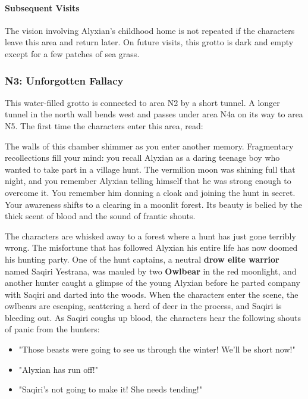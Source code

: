 \documentclass[10pt,a4,twoside,twocolumn,openany,nodeprecatedcode]{dndbook}
\begin{document}
\paragraph{Subsequent Visits}
The vision involving Alyxian's childhood home is not repeated if the characters leave this area and return later. On future visits, this grotto is dark and empty except for a few patches of sea grass.
\subsubsection{N3: Unforgotten Fallacy}
This water-filled grotto is connected to area N2 by a short tunnel. A longer tunnel in the north wall bends west and passes under area N4a on its way to area N5.
The first time the characters enter this area, read:
\begin{DndReadAloud}{}
The walls of this chamber shimmer as you enter another memory. Fragmentary recollections fill your mind: you recall Alyxian as a daring teenage boy who wanted to take part in a village hunt. The vermilion moon was shining full that night, and you remember Alyxian telling himself that he was strong enough to overcome it. You remember him donning a cloak and joining the hunt in secret.
Your awareness shifts to a clearing in a moonlit forest. Its beauty is belied by the thick scent of blood and the sound of frantic shouts.
\end{DndReadAloud}

The characters are whisked away to a forest where a hunt has just gone terribly wrong. The misfortune that has followed Alyxian his entire life has now doomed his hunting party. One of the hunt captains, a neutral \textbf{drow elite warrior} named Saqiri Yestrana, was mauled by two \textbf{Owlbear} in the red moonlight, and another hunter caught a glimpse of the young Alyxian before he parted company with Saqiri and darted into the woods.
When the characters enter the scene, the owlbears are escaping, scattering a herd of deer in the process, and Saqiri is bleeding out. As Saqiri coughs up blood, the characters hear the following shouts of panic from the hunters:
\begin{itemize}

\item "Those beasts were going to see us through the winter! We'll be short now!"
\item "Alyxian has run off!"
\item "Saqiri's not going to make it! She needs tending!"
\end{itemize}
\end{document}
